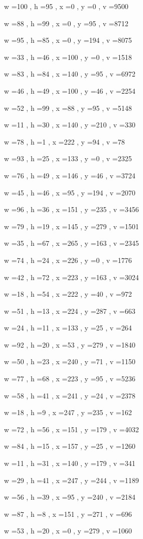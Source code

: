 \documentclass[11pt]{article}
\begin{document}
w =100 , h =95 , x =0 , y =0 , v =9500
\par
w =88 , h =99 , x =0 , y =95 , v =8712
\par
w =95 , h =85 , x =0 , y =194 , v =8075
\par
w =33 , h =46 , x =100 , y =0 , v =1518
\par
w =83 , h =84 , x =140 , y =95 , v =6972
\par
w =46 , h =49 , x =100 , y =46 , v =2254
\par
w =52 , h =99 , x =88 , y =95 , v =5148
\par
w =11 , h =30 , x =140 , y =210 , v =330
\par
w =78 , h =1 , x =222 , y =94 , v =78
\par
w =93 , h =25 , x =133 , y =0 , v =2325
\par
w =76 , h =49 , x =146 , y =46 , v =3724
\par
w =45 , h =46 , x =95 , y =194 , v =2070
\par
w =96 , h =36 , x =151 , y =235 , v =3456
\par
w =79 , h =19 , x =145 , y =279 , v =1501
\par
w =35 , h =67 , x =265 , y =163 , v =2345
\par
w =74 , h =24 , x =226 , y =0 , v =1776
\par
w =42 , h =72 , x =223 , y =163 , v =3024
\par
w =18 , h =54 , x =222 , y =40 , v =972
\par
w =51 , h =13 , x =224 , y =287 , v =663
\par
w =24 , h =11 , x =133 , y =25 , v =264
\par
w =92 , h =20 , x =53 , y =279 , v =1840
\par
w =50 , h =23 , x =240 , y =71 , v =1150
\par
w =77 , h =68 , x =223 , y =95 , v =5236
\par
w =58 , h =41 , x =241 , y =24 , v =2378
\par
w =18 , h =9 , x =247 , y =235 , v =162
\par
w =72 , h =56 , x =151 , y =179 , v =4032
\par
w =84 , h =15 , x =157 , y =25 , v =1260
\par
w =11 , h =31 , x =140 , y =179 , v =341
\par
w =29 , h =41 , x =247 , y =244 , v =1189
\par
w =56 , h =39 , x =95 , y =240 , v =2184
\par
w =87 , h =8 , x =151 , y =271 , v =696
\par
w =53 , h =20 , x =0 , y =279 , v =1060
\par
\newpage
\end{document}
